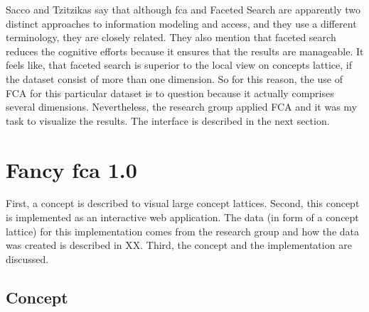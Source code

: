 \documentclass[11pt]{report}
\begin{document}
Sacco and Tzitzikas \cite{Sacco2009} say that although \acrshort{fca} and Faceted Search are apparently two distinct approaches to information modeling and access, and they use a different terminology, they are closely related. They also mention that faceted search reduces the cognitive efforts because it ensures that the results are manageable. It feels like, that faceted search is superior to the local view on concepts lattice, if the dataset consist of more than one dimension. So for this reason, the use of FCA for this particular dataset is to question because it actually comprises several dimensions. Nevertheless, the research group applied FCA and it was my task to visualize the results. The interface is described in the next section.

\chapter{Fancy \acrshort{fca} 1.0}
\label{Fancy 1.0}

First, a concept is described to visual large concept lattices. Second, this concept is implemented as an interactive web application. The data (in form of a concept lattice) for this implementation comes from the research group and how the data was created is described in XX. Third, the concept and the implementation are discussed.

\section{Concept}
\end{document}
